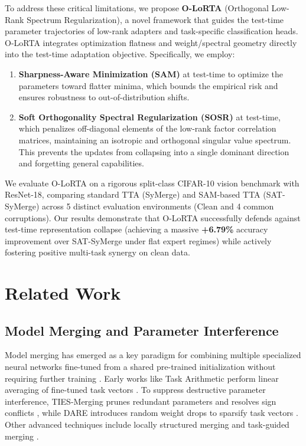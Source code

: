 \documentclass{article}
\theoremstyle{plain}
\theoremstyle{definition}
\theoremstyle{remark}
\begin{document}
To address these critical limitations, we propose \textbf{O-LoRTA} (Orthogonal Low-Rank Spectrum Regularization), a novel framework that guides the test-time parameter trajectories of low-rank adapters and task-specific classification heads. O-LoRTA integrates optimization flatness and weight/spectral geometry directly into the test-time adaptation objective. Specifically, we employ:
\begin{enumerate}
    \item \textbf{Sharpness-Aware Minimization (SAM)} \cite{foret2021sharpness} at test-time to optimize the parameters toward flatter minima, which bounds the empirical risk and ensures robustness to out-of-distribution shifts.
    \item \textbf{Soft Orthogonality Spectral Regularization (SOSR)} \cite{yu2024dare} at test-time, which penalizes off-diagonal elements of the low-rank factor correlation matrices, maintaining an isotropic and orthogonal singular value spectrum. This prevents the updates from collapsing into a single dominant direction and forgetting general capabilities.
\end{enumerate}

We evaluate O-LoRTA on a rigorous split-class CIFAR-10 vision benchmark with ResNet-18, comparing standard TTA (SyMerge) and SAM-based TTA (SAT-SyMerge) across 5 distinct evaluation environments (Clean and 4 common corruptions). Our results demonstrate that O-LoRTA successfully defends against test-time representation collapse (achieving a massive \textbf{+6.79\%} accuracy improvement over SAT-SyMerge under flat expert regimes) while actively fostering positive multi-task synergy on clean data.

\section{Related Work}
\label{submission-related-work}
\subsection{Model Merging and Parameter Interference}
Model merging has emerged as a key paradigm for combining multiple specialized neural networks fine-tuned from a shared pre-trained initialization without requiring further training \cite{wortsman2022model, li2023deep, tang2024fusionbench}. Early works like Task Arithmetic perform linear averaging of fine-tuned task vectors \cite{ilharco2022editing}. To suppress destructive parameter interference, TIES-Merging prunes redundant parameters and resolves sign conflicts \cite{yadav2023ties}, while DARE introduces random weight drops to sparsify task vectors \cite{yu2024dare}. Other advanced techniques include locally structured merging \cite{fan2024locally} and task-guided merging \cite{liu2023task}.
\end{document}
